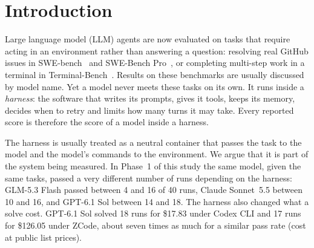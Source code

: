 \section{Introduction}

\label{sec:intro}

Large language model (LLM) agents are now evaluated on tasks that require acting in an environment rather than
answering a question: resolving real GitHub issues in SWE-bench~\cite{jimenez2024swebench} and SWE-Bench
Pro~\cite{deng2025sweprobench}, or completing multi-step work in a terminal in
Terminal-Bench~\cite{merrill2026terminalbench,tb4}. Results on these benchmarks are usually discussed by model
name. Yet a model never meets these tasks on its own. It runs inside a \emph{harness}: the software that writes
its prompts, gives it tools, keeps its memory, decides when to retry and limits how many turns it may take. Every
reported score is therefore the score of a model inside a harness.

The harness is usually treated as a neutral container that passes the task to the model and the model's commands
to the environment. We argue that it is part of the system being measured. In Phase~1 of this study the same model,
given the same tasks, passed a very different number of runs depending on the harness: GLM-5.3 Flash passed
between 4 and 16 of 40 runs, Claude Sonnet~5.5 between 10 and 16, and GPT-6.1 Sol between 14 and 18. The harness
also changed what a solve cost. GPT-6.1 Sol solved 18 runs for \$17.83 under Codex CLI and 17 runs for \$126.05
under ZCode, about seven times as much for a similar pass rate (cost at public list prices).

